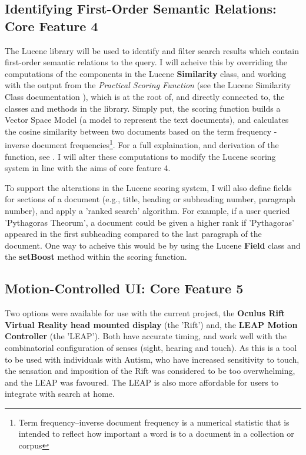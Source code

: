 \documentclass[a4paper, 10pt]{article}
\begin{document}
\subsection{Identifying First-Order Semantic Relations: Core Feature 4}\label{apache}
The Lucene library will be used to identify and filter search results which contain first-order semantic relations to the query. I will acheive this by overriding the computations of the components in the Lucene \textbf{Similarity} class, and working with the output from the \textit{Practical Scoring Function} (see the Lucene Similarity Class documentation \cite{similarity}), which is at the root of, and directly connected to, the classes and methods in the library. Simply put, the scoring function builds a Vector Space Model (a model to represent the text documents), and calculates the cosine similarity between two documents based on the term frequency - inverse document frequencies\footnote{Term frequency–inverse document frequency is a numerical statistic that is intended to reflect how important a word is to a document in a collection or corpus}. For a full explaination, and derivation of the function, see \cite{similarity}. I will alter these computations to modify the Lucene scoring system in line with the aims of core feature 4. 

To support the alterations in the Lucene scoring system, I will also define fields for sections of a document (e.g., title, heading or subheading number, paragraph number), and apply a 'ranked search' algorithm. For example, if a user queried 'Pythagoras Theorum', a document could be given a higher rank if 'Pythagoras' appeared in the first subheading compared to the last paragraph of the document. One way to acheive this would be by using the Lucene \textbf{Field} class and the \textbf{setBoost} method within the scoring function. 

\subsection{Motion-Controlled UI: Core Feature 5}\label{hardware}
Two options were available for use with the current project, the \textbf{Oculus Rift Virtual Reality head mounted display} (the 'Rift') and, the \textbf{LEAP Motion Controller} (the 'LEAP'). Both have accurate timing, and work well with the combinatorial configuration of senses (sight, hearing and touch). As this is a tool to be used with individuals with Autism, who have increased sensitivity to touch, the sensation and imposition of the Rift was considered to be too overwhelming, and the LEAP was favoured. The LEAP is also more affordable for users to integrate with search at home. 
\end{document}
